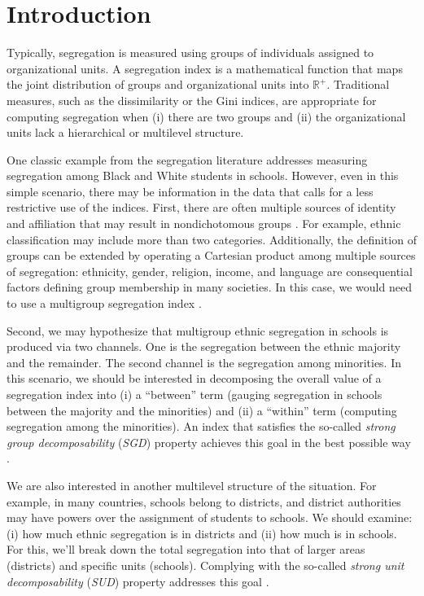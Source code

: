 \section{Introduction}
Typically, segregation is measured using groups of individuals assigned to organizational units. A segregation index is a mathematical function that maps the joint distribution of groups and organizational units into $\mathbb{R}^+$. Traditional measures, such as the dissimilarity \citep{duncan_duncan_1955} or the Gini \citep{fluckiger_silber_1999} indices, are appropriate for computing segregation when (i) there are two groups and (ii) the organizational units lack a hierarchical or multilevel structure.

One classic example from the segregation literature addresses measuring segregation among Black and White students in schools. However, even in this simple scenario, there may be information in the data that calls for a less restrictive use of the indices.
First, there are often multiple sources of identity and affiliation that may result in nondichotomous groups \citep{akerlof_kranton_2010}. For example, ethnic classification may include more than two categories. Additionally, the definition of groups can be extended by operating a Cartesian product among multiple sources of segregation: ethnicity, gender, religion, income, and language are consequential factors defining group membership in many societies. In this case, we would need to use a multigroup segregation index \citep{reardon2002measures}.

Second, we may hypothesize that multigroup ethnic segregation in schools is produced via two channels. One is the segregation between the ethnic majority and the remainder. The second channel is the segregation among minorities. In this scenario, we should be interested in decomposing the overall value of a segregation index into (i) a ``between'' term (gauging segregation in schools between the majority and the minorities) and (ii) a ``within'' term (computing segregation among the minorities). An index that satisfies the so-called \textit{strong group decomposability} (\textit{SGD}) property achieves this goal in the best possible way \citep{frankel_volij_2011}.

We are also interested in another multilevel structure of the situation. For example, in many countries, schools belong to districts, and district authorities may have powers over the assignment of students to schools. We should examine: (i) how much ethnic segregation is in districts and (ii) how much is in schools. For this, we'll break down the total segregation into that of larger areas (districts) and specific units (schools). Complying with the so-called \textit{strong unit decomposability} (\textit{SUD}) property addresses this goal \citep{frankel_volij_2011}.

